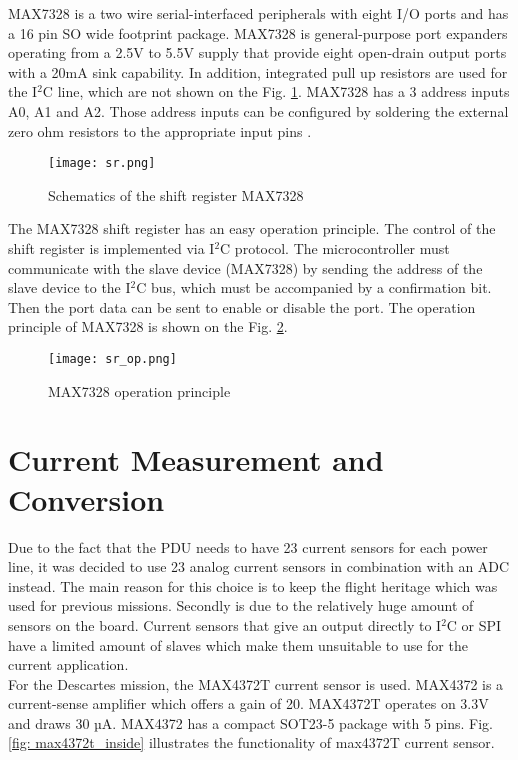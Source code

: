  MAX7328 is a two wire  serial-interfaced peripherals with eight I/O ports and has a 16 pin SO wide footprint package. MAX7328 is general-purpose port expanders operating from a 2.5V to 5.5V supply that provide eight open-drain output ports with a 20mA sink capability. In addition, integrated pull up resistors are used for the I$^2$C line, which are not shown on the Fig. \ref{fig: sr1}.       MAX7328 has a 3 address inputs A0, A1 and A2. Those address inputs can be configured by soldering the external zero ohm resistors to the appropriate input pins \cite{29}.  


\begin{figure}[h]
	\centering
	\texttt{[image: sr.png]}
	\caption{ Schematics of the shift register MAX7328}
	\label{fig: sr1}
\end{figure}

The MAX7328 shift register has an easy operation principle. The control of the shift register is implemented via I$^2$C protocol. The microcontroller must communicate with the slave device (MAX7328) by sending the address of the slave device to the I$^2$C bus, which must be accompanied by a confirmation bit. Then the port data can be sent to enable or disable the port. The operation principle of MAX7328 is shown on the Fig. \ref{fig: sr_op1}. 
\newpage
\begin{figure}[h]
	\centering
	\texttt{[image: sr\_op.png]}
	\caption{ MAX7328 operation principle\cite{29}}
	\label{fig: sr_op1}
\end{figure}
 
\section{Current Measurement and Conversion}

Due to the fact that the PDU needs to have 23 current sensors for each power line, it was decided to use 23 analog current sensors in combination with an ADC instead. The main reason for this choice is to keep the flight heritage which was used for previous missions. Secondly is due to the relatively huge amount of sensors on the board. Current sensors that give an output directly to I$^2$C or SPI have a limited amount of slaves which make them unsuitable to use for the current application.\\

For the Descartes mission, the MAX4372T current sensor is used. MAX4372 is a current-sense amplifier which offers a gain of 20. MAX4372T operates on 3.3V and draws 30 µA. MAX4372 has a compact SOT23-5 package with 5 pins. Fig. \ref{fig: max4372t_inside} illustrates the functionality of max4372T current sensor.

